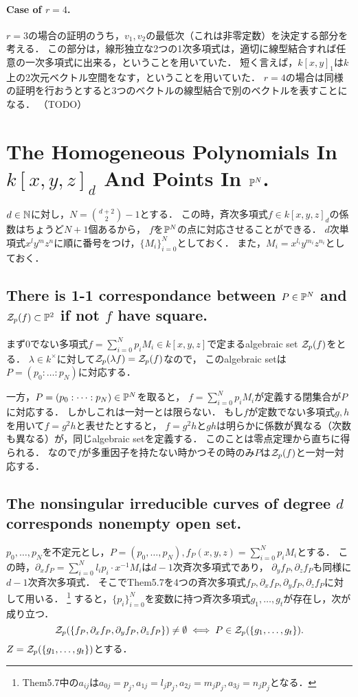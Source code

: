 \documentclass[a4paper]{jsarticle}
\begin{document}
    \paragraph{Case of $r=4$.}
    $r=3$の場合の証明のうち，$v_1, v_2$の最低次（これは非零定数）を決定する部分を考える．
    この部分は，線形独立な2つの1次多項式は，適切に線型結合すれば任意の一次多項式に出来る，ということを用いていた．
    短く言えば，$k[x,y]_1$は$k$上の2次元ベクトル空間をなす，ということを用いていた．
    $r=4$の場合は同様の証明を行おうとすると3つのベクトルの線型結合で別のベクトルを表すことになる．
    （TODO）

\section{The Homogeneous Polynomials In $k[x,y,z]_d$ And Points In $\mathbb{P}^N$.} %
    $d \in \mathbb{N}$に対し，$N=\binom{d+2}{2}-1$とする．
    この時，斉次多項式$f \in k[x,y,z]_d$の係数はちょうど$N+1$個あるから，
    $f$を$\mathbb{P}^N$の点に対応させることができる．
    $d$次単項式$x^l y^m z^n$に順に番号をつけ，$\{M_i\}_{i=0}^{N}$としておく．
    また，$M_i=x^{l_i} y^{m_i} z^{n_i}$としておく．

    \subsection{There is 1-1 correspondance between $P \in \mathbb{P}^N$ and $\mathcal{Z}_p(f) \subset \mathbb{P}^2$ if not $f$ have square.}
    まず0でない多項式$f=\sum_{i=0}^{N}p_i M_i \in k[x,y,z]$で定まるalgebraic set $\mathcal{Z}_p(f)$をとる．
    $\lambda \in k^{\times}$に対して$\mathcal{Z}_p(\lambda f)=\mathcal{Z}_p(f)$なので，
    このalgebraic setは$P=(p_0:\dots:p_N)$に対応する．

    一方，$P=(p_0:\dots:p_N) \in \mathbb{P}^N$を取ると，
    $f=\sum_{i=0}^{N}p_i M_i$が定義する閉集合が$P$に対応する．
    しかしこれは一対一とは限らない．
    もし$f$が定数でない多項式$g,h$を用いて$f=g^2 h$と表せたとすると，
    $f=g^2 h$と$gh$は明らかに係数が異なる（次数も異なる）が，同じalgebraic setを定義する．
    このことは零点定理から直ちに得られる．
    なので$f$が多重因子を持たない時かつその時のみ$P$は$\mathcal{Z}_p(f)$と一対一対応する．

    \subsection{The nonsingular irreducible curves of degree $d$ corresponds nonempty open set.}
    $p_0,\dots,p_N$を不定元とし，$P=(p_0,\dots,p_N), f_P(x,y,z)=\sum_{i=0}^{N}p_i M_i$とする．
    この時，$\partial_x f_P=\sum_{i=0}^{N} l_i p_i \cdot x^{-1} M_i$は$d-1$次斉次多項式であり，
    $\partial_y f_P, \partial_z f_P$も同様に$d-1$次斉次多項式．
    そこでThem5.7を4つの斉次多項式$f_P, \partial_x f_P, \partial_y f_P, \partial_z f_P$に対して用いる．
    \footnote{Them5.7中の$a_{ij}$は$a_{0j}=p_j, a_{1j}=l_j p_j, a_{2j}=m_j p_j,a_{3j}=n_j p_j$となる．}
    すると，$\{p_i\}_{i=0}^N$を変数に持つ斉次多項式$g_1,\dots,g_t$が存在し，次が成り立つ．
    \[ \mathcal{Z}_p(\{f_P, \partial_x f_P, \partial_y f_P, \partial_z f_P\}) \neq \emptyset \iff P \in \mathcal{Z}_p(\{g_1,\dots,g_t\}). \]
    $Z=\mathcal{Z}_p(\{g_1,\dots,g_t\})$とする．
\end{document}
